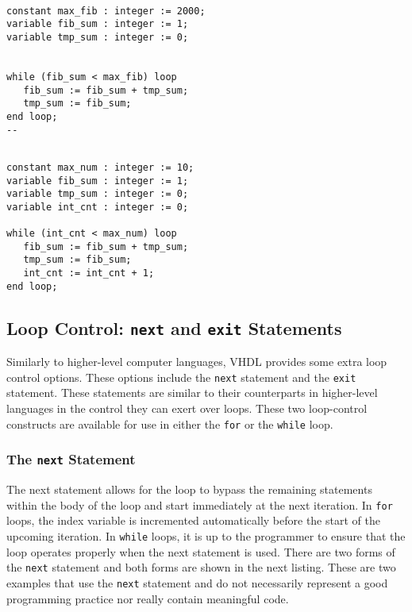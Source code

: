 \vspace{10pt}
\noindent
\begin{minipage}{0.5\linewidth}
\begin{lstlisting}

constant max_fib : integer := 2000;
variable fib_sum : integer := 1;
variable tmp_sum : integer := 0;


while (fib_sum < max_fib) loop
   fib_sum := fib_sum + tmp_sum;
   tmp_sum := fib_sum;
end loop;
--
\end{lstlisting}
\end{minipage}
\noindent
\begin{minipage}{0.5\linewidth}
\begin{lstlisting}

constant max_num : integer := 10; 
variable fib_sum : integer := 1; 
variable tmp_sum : integer := 0; 
variable int_cnt : integer := 0; 

while (int_cnt < max_num) loop
   fib_sum := fib_sum + tmp_sum; 
   tmp_sum := fib_sum; 
   int_cnt := int_cnt + 1; 
end loop;
\end{lstlisting}
\end{minipage}

\subsection{Loop Control: \texttt{next} and \texttt{exit} Statements}

Similarly to higher-level computer languages, VHDL provides some extra loop control options. These options include the \texttt{next} statement and the \texttt{exit} statement. These statements are similar to their counterparts in higher-level languages in the control they can exert over loops. These two loop-control constructs are available for use in either the \texttt{for} or the \texttt{while} loop. 

\subsubsection{The \texttt{next} Statement}
The next statement allows for the loop to bypass the remaining statements within the body of the loop and start immediately at the next iteration. In \texttt{for} loops, the index variable is incremented automatically before the start of the upcoming iteration. In \texttt{while} loops, it is up to the programmer to ensure that the loop operates properly when the next statement is used. There are two forms of the \texttt{next} statement and both forms are shown in the next listing. These are two examples that use the \texttt{next} statement and do not necessarily represent a good programming practice nor really contain meaningful code.

